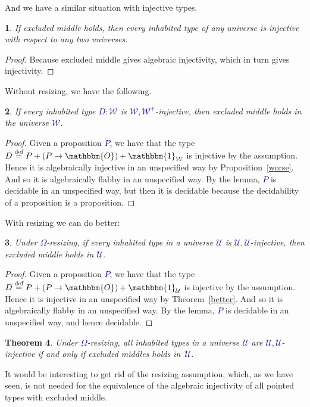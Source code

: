 \documentclass[10pt]{article}
\newcommand{\db}{\textcolor{darkblue}}
\newcommand{\df}[1]{\emph{\db{#1}}}
\newcommand{\m}[1]{\db{$#1$}}
\newcommand{\U}{\mathcal{U}}
\newcommand{\W}{\mathcal{W}}
\newcommand{\Zero}{\mathbbm{O}}
\newcommand{\One}{\mathbbm{1}}
\newcommand{\eqdef}{\overset{\text{def}}{=}}
\newtheorem{numbered}{}
\newtheorem{theorem}[numbered]{Theorem}
\theoremstyle{definition}
\begin{document}
\noindent
And we have a similar situation with injective types.
\begin{numbered}
  If excluded middle holds, then every inhabited type of any universe is
  injective with respect to any two universes.
\end{numbered}
\begin{proof}
  Because excluded middle gives algebraic injectivity, which in turn gives
  injectivity.
\end{proof}
\noindent Without resizing, we have the following.
\begin{numbered}
  If every inhabited type \m{D:\W} is \m{\W,\W^+}-injective, then
  excluded middle holds in the universe \m{\W}.
\end{numbered}
\begin{proof}
  Given a proposition \m{P}, we have that the type \m{D \eqdef P + (P
    \to \Zero) + \One_{\W}} is injective by the assumption. Hence it
  is algebraically injective in an unspecified way by
  Proposition~\ref{worse}. And so it is algebraically flabby in an
  unspecified way.  By the lemma, \m{P} is decidable in an unspecified
  way, but then it is decidable because the decidability of a
  proposition is a proposition.
\end{proof}
\noindent With resizing we can do better:
\begin{numbered}
  Under \m{\Omega}-resizing, if every inhabited type in a universe \m{\U} is
  \m{\U,\U}-injective, then excluded middle holds in \m{\U}.
\end{numbered}
\begin{proof}
  Given a proposition \m{P}, we have that the type \m{D \eqdef P + (P
    \to \Zero) + \One_{\U}} is injective by the assumption. Hence it
  is injective in an unspecified way by
  Theorem~\ref{better}. And so it is algebraically flabby in an
  unspecified way.  By the lemma, \m{P} is decidable in an unspecified
  way, and hence decidable.
\end{proof}
\begin{theorem} %
  Under \m{\Omega}-resizing, all inhabited types in a universe \m{\U} are
  \m{\U,\U}-injective if and only if excluded middles
  holds in~\m{\U}.
\end{theorem}
\noindent It would be interesting to get rid of the resizing assumption, which,
as we have seen, is not needed for the equivalence of the algebraic
injectivity of all pointed types with excluded middle.



\end{document}
